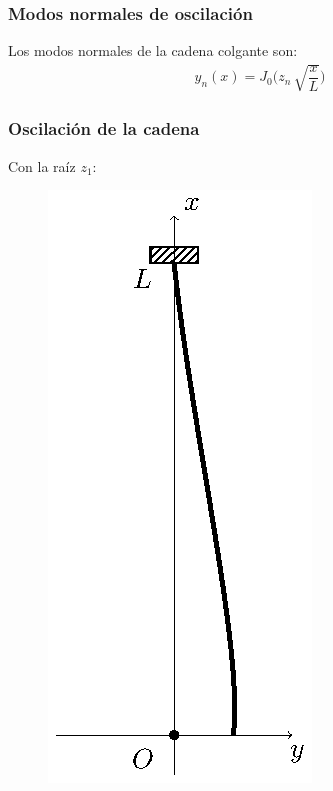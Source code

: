 \documentclass[12pt]{beamer}
\begin{document}
\begin{frame}
\frametitle{Modos normales de oscilación}
Los modos normales de la cadena colgante son:
\pause
\begin{align}
y_{n} (x) = J_{0} \bigg( z_{n} \, \sqrt{\dfrac{x}{L}} \bigg)
\label{eq:ecuacion_28}
\end{align}
\end{frame}
\begin{frame}
\frametitle{Oscilación de la cadena}
Con la raíz $z_{1}$:
\begin{figure}[H]
    \centering
    \includegraphics[scale=0.75]{Imagenes/Cadena_Oscilante_03.eps}
\end{figure}
\end{frame}
\end{document}

